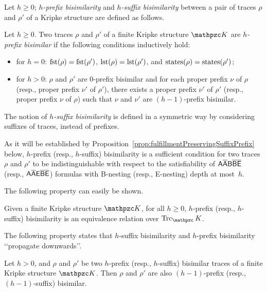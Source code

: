 %
%

Let $h\geq 0$; \emph{$h$-prefix bisimilarity} and \emph{$h$-suffix bisimilarity} between a pair of traces $\rho$ and $\rho'$ of a Kripke structure are defined as follows. 

\begin{definition}
Let $h\geq 0$. Two traces  $\rho$ and $\rho'$ of a finite Kripke structure $\Ku$
are \emph{$h$-prefix bisimilar} if the following conditions inductively hold:
\begin{itemize}
  \item for $h=0$: $\operatorname{fst}(\rho)=\operatorname{fst}(\rho')$, $\operatorname{lst}(\rho)=\operatorname{lst}(\rho')$, and $\operatorname{states}(\rho)=\operatorname{states}(\rho')$;
  \item for $h>0$: $\rho$ and $\rho'$ are $0$-prefix bisimilar and for each proper prefix $\nu$ of $\rho$ (resp., proper prefix $\nu'$ of $\rho'$), there exists
  a proper prefix $\nu'$ of $\rho'$ (resp., proper prefix $\nu$ of $\rho$) such that $\nu$ and $\nu'$ are $(h-1)$-prefix bisimilar.
\end{itemize}

The notion of \emph{$h$-suffix bisimilarity} is defined in a symmetric way by considering suffixes of traces, instead of prefixes.
\end{definition}

As it will be established by Proposition~\ref{prop:fulfillmentPreservingSuffixPrefix} below, $h$-prefix (resp., $h$-suffix) bisimilarity is a sufficient condition for two traces  $\rho$ and $\rho'$ to be indistinguishable with respect to the satisfiability of $\mathsf{A\overline{A}B\overline{B}\overline{E}}$ (resp., $\mathsf{A\overline{A}E\overline{B}\overline{E}}$) formulas with B-nesting (resp., E-nesting) depth at most~$h$.

The following property can easily be shown.
\begin{property}
Given a finite Kripke structure $\Ku$, for all $h\geq 0$, $h$-prefix (resp., $h$-suffix) bisimilarity is an equivalence relation over $\Trk_\Ku$.
\end{property}

The following property states that $h$-suffix bisimilarity and $h$-prefix bisimilarity \lq\lq propagate downwards\rq\rq .
\begin{property}\label{property:bisimDown}
Let $h> 0$, and $\rho$ and $\rho'$ be two $h$-prefix (resp., $h$-suffix)  bisimilar traces of a finite Kripke structure $\Ku$. 
Then $\rho$ and $\rho'$ are also $(h-1)$-prefix  (resp., $(h-1)$-suffix) bisimilar.
\end{property}

